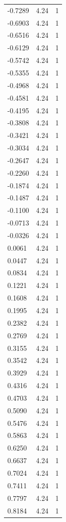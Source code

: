 \begin{longtable}{lrr}
  -0.7289 & 4.24 & 1 \\
  -0.6903 & 4.24 & 1 \\
  -0.6516 & 4.24 & 1 \\
  -0.6129 & 4.24 & 1 \\
  -0.5742 & 4.24 & 1 \\
  -0.5355 & 4.24 & 1 \\
  -0.4968 & 4.24 & 1 \\
  -0.4581 & 4.24 & 1 \\
  -0.4195 & 4.24 & 1 \\
  -0.3808 & 4.24 & 1 \\
  -0.3421 & 4.24 & 1 \\
  -0.3034 & 4.24 & 1 \\
  -0.2647 & 4.24 & 1 \\
  -0.2260 & 4.24 & 1 \\
  -0.1874 & 4.24 & 1 \\
  -0.1487 & 4.24 & 1 \\
  -0.1100 & 4.24 & 1 \\
  -0.0713 & 4.24 & 1 \\
  -0.0326 & 4.24 & 1 \\
  0.0061 & 4.24 & 1 \\
  0.0447 & 4.24 & 1 \\
  0.0834 & 4.24 & 1 \\
  0.1221 & 4.24 & 1 \\
  0.1608 & 4.24 & 1 \\
  0.1995 & 4.24 & 1 \\
  0.2382 & 4.24 & 1 \\
  0.2769 & 4.24 & 1 \\
  0.3155 & 4.24 & 1 \\
  0.3542 & 4.24 & 1 \\
  0.3929 & 4.24 & 1 \\
  0.4316 & 4.24 & 1 \\
  0.4703 & 4.24 & 1 \\
  0.5090 & 4.24 & 1 \\
  0.5476 & 4.24 & 1 \\
  0.5863 & 4.24 & 1 \\
  0.6250 & 4.24 & 1 \\
  0.6637 & 4.24 & 1 \\
  0.7024 & 4.24 & 1 \\
  0.7411 & 4.24 & 1 \\
  0.7797 & 4.24 & 1 \\
  0.8184 & 4.24 & 1 \\

\end{longtable}
